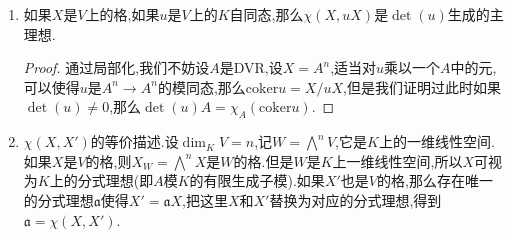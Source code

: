 \begin{enumerate}
\begin{proof}
    	第一件事只要取$X=X_1\cap X_2\cap X_3$,那么$\chi(X_1,X_2)=\chi(X_1/X)\chi(X_2/X)^{-1}$等,相乘就是1.第二件事也是取$X=X_1\cap X_2$即可.第三件事平凡.
    \end{proof}
    \item 如果$X$是$V$上的格,如果$u$是$V$上的$K$自同态,那么$\chi(X,uX)$是$\det(u)$生成的主理想.
    \begin{proof}
    	
    	通过局部化,我们不妨设$A$是DVR,设$X=A^n$,适当对$u$乘以一个$A$中的元,可以使得$u$是$A^n\to A^n$的模同态,那么$\mathrm{coker}u=X/uX$,但是我们证明过此时如果$\det(u)\not=0$,那么$\det(u)A=\chi_A(\mathrm{coker}u)$.
    \end{proof}
    \item $\chi(X,X')$的等价描述.设$\dim_KV=n$,记$W=\bigwedge^nV$,它是$K$上的一维线性空间.如果$X$是$V$的格,则$X_W=\bigwedge^nX$是$W$的格.但是$W$是$K$上一维线性空间,所以$X$可视为$K$上的分式理想(即$A$模$K$的有限生成子模).如果$X'$也是$V$的格,那么存在唯一的分式理想$\mathfrak{a}$使得$X'=\mathfrak{a}X$,把这里$X$和$X'$替换为对应的分式理想,得到$\mathfrak{a}=\chi(X,X')$.
\end{enumerate}

